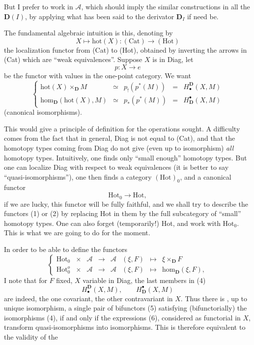 \documentclass[11pt]{article}
\newcommand{\printedpage}[1]{\marginpar{\footnotesize p.~#1}}
\newcommand{\msp}[1]{\marginpar{\footnotesize [#1]}}
\newcommand{\Hot}{\mathrm{Hot}}
\newcommand{\D}{\mathbf{D}}
\newcommand{\hm}{\mathrm{hom}}
\begin{document}
But I prefer to work in $\mathcal{A}$, which should imply the similar constructions in all the $\D(I)$, by applying what has been said to the derivator $\D_I$ if need be.

The fundamental algebraic intuition is this, denoting by
\[
X \longmapsto \mathrm{hot}(X) : (\mathrm{Cat}) \longrightarrow (\Hot)
\]
the localization functor from (Cat) to (Hot), obtained by inverting the arrows in (Cat) which are ``weak equivalences''. Suppose $X$ is in Diag, let
\[
p : X \longrightarrow e
\]
be the functor with values in the one-point category. We want
\[
\left\{
\begin{array}{rcccl}
\mathrm{hot}(X) \times_{\D} M & \simeq & p_!(p^*(M)) & = & H^{\D}_{\bullet}(X, M)\\
\hm_{\D}(\mathrm{hot}(X), M) & \simeq & p_*(p^*(M)) & = & H^{\bullet}_{\D}(X, M)
\end{array}
\right.
\tag*{(4)}
\]
(canonical isomorphisms).

\msp{page 3}
This would give a principle of definition for the operations sought. A difficulty comes from the fact that in general, Diag is not equal to (Cat), and that the homotopy types coming from Diag do not give (even up to isomorphism) \textit{all} homotopy types. Intuitively, one finds only ``small enough'' homotopy types. But one can localize Diag with respect to weak equivalences (it is better to say ``quasi-isomorphisms''), one then finds a category $(\Hot)_0$, and a canonical functor
\[
\Hot_0 \longrightarrow \Hot,
\]
if we are lucky, this functor will be fully faithful, and we shall try to describe the functors (1) or (2) by replacing Hot in them by the full subcategory of ``small'' homotopy types. One can also forget (temporarily!) Hot, and work with $\Hot_0$. This is what we are going to do for the moment.

In order to be able to define the functors
\[
\left\{
\begin{array}{lccccccl}
\Hot_0 & \times & \mathcal{A} & \longrightarrow & \mathcal{A} & (\xi, F) & \longmapsto & \xi \times_{\D} F\\
\Hot_0^o & \times & \mathcal{A} & \longrightarrow & \mathcal{A} & (\xi, F) & \longmapsto & \hm_{\D}(\xi, F),
\end{array}
\right.
\tag*{(5)}
\]
I note that for $F$ fixed, $X$ variable in Diag, the
\printedpage{3}
\msp{page 4}
last members in (4)
\[
H^{\D}_{\bullet}(X, M), \qquad H^{\bullet}_{\D}(X, M)
\tag*{(6)}
\]
are indeed, the one covariant, the other contravariant in $X$. Thus there is , up to unique isomorphism, a single pair of bifunctors (5) satisfying (bifunctorially) the isomorphisms (4), if and only if the expressions (6), considered as functorial in $X$, transform quasi-isomorphisms into isomorphisms. This is therefore equivalent to the validity of the %
\end{document}

